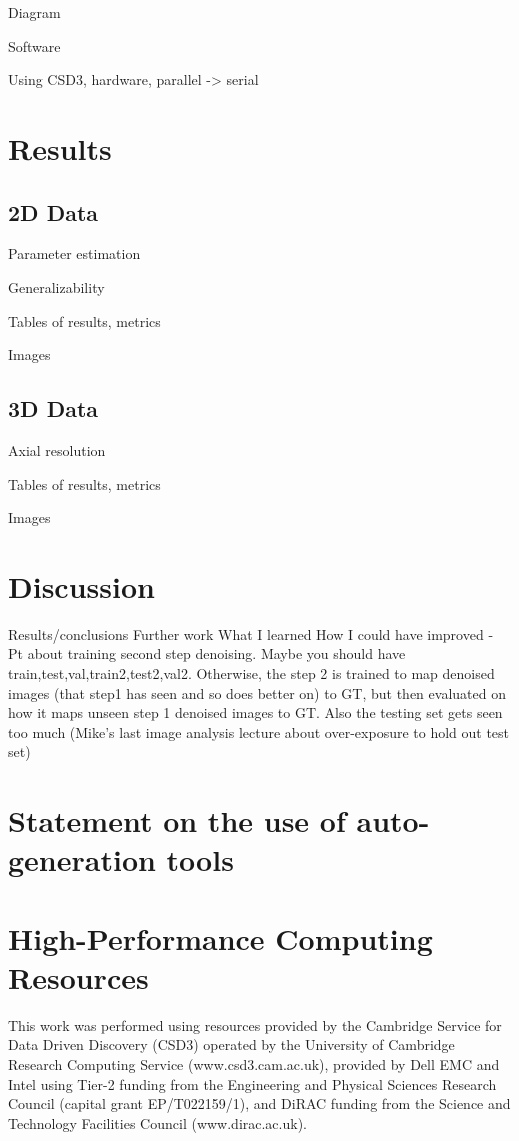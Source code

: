 \documentclass[12pt]{article}
\begin{document}
Diagram

Software

Using CSD3, hardware, parallel -> serial

\section{Results}

\subsection{2D Data}

Parameter estimation

Generalizability

Tables of results, metrics

Images

\subsection{3D Data}

Axial resolution

Tables of results, metrics

Images

\section{Discussion}
Results/conclusions
Further work
What I learned
How I could have improved
- Pt about training second step denoising. Maybe you should have train,test,val,train2,test2,val2.
Otherwise, the step 2 is trained to map denoised images (that step1 has seen and so does better on) to GT,
but then evaluated on how it maps unseen step 1 denoised images to GT. Also the testing set gets seen too much (Mike's
last image analysis lecture about over-exposure to hold out test set)




\appendix

\section{Statement on the use of auto-generation tools}

\section {High-Performance Computing Resources}

This work was performed using resources provided by the Cambridge Service for Data Driven Discovery (CSD3) operated by the University of Cambridge Research Computing Service (www.csd3.cam.ac.uk),
provided by Dell EMC and Intel using Tier-2 funding from the Engineering and Physical Sciences Research Council (capital grant EP/T022159/1),
and DiRAC funding from the Science and Technology Facilities Council (www.dirac.ac.uk).
\end{document}
